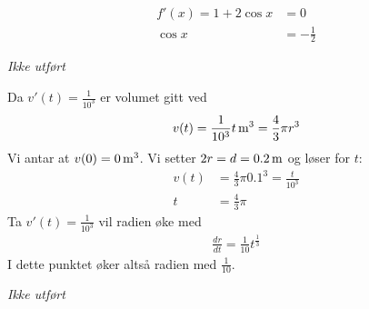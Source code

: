 \documentclass[a4paper,norsk,12pt]{article}
\begin{document}
\begin{align*}
  f'(x) = 1 + 2\cos{x} & = 0\\
  \cos{x} & = -\frac{1}{2}
\end{align*}

\textit{Ikke utført}

Da $v'(t) = \frac{1}{10^3}$ er volumet gitt ved
\begin{align*}
  v(t) = \unit[\frac{1}{10^3}t]{m^3} = \frac{4}{3}\pi r^3
\end{align*}
Vi antar at $v(0) = \unit[0]{m^3}$. Vi setter $2r = d = \unit[0.2]{m}$ og løser
for $t$:
\begin{align*}
  v(t) &= \frac{4}{3}\pi 0.1^3 = \frac{t}{10^3} \\
  t &= \frac{4}{3}\pi
\end{align*}
Ta $v'(t) = \frac{1}{10^3}$ vil radien øke med
\begin{align*}
  \frac{dr}{dt} = \frac{1}{10}t^\frac{1}{3}
\end{align*}
I dette punktet øker altså radien med $\frac{1}{10}$.

\textit{Ikke utført}
\end{document}
